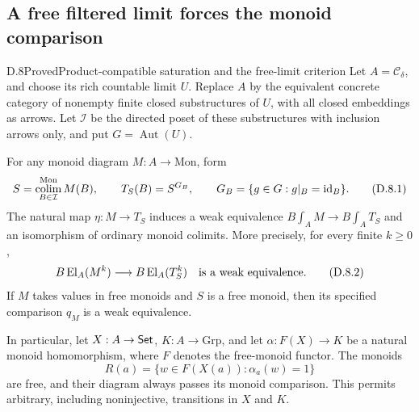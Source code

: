 \subsection{A free filtered limit forces the monoid comparison}

\begin{claim}{D.8}{Proved}{Product-compatible saturation and the free-limit criterion}
\label{D:free-limit-criterion}
Let $A=\mathcal C_\delta$, and choose its rich countable limit $U$.
Replace $A$ by the equivalent concrete category of nonempty finite
closed substructures of $U$, with all closed embeddings as arrows.
Let $\mathcal I$ be the directed poset of these substructures with
inclusion arrows only, and put $G=\operatorname{Aut}(U)$.

For any monoid diagram $M:A\to\mathrm{Mon}$, form
\[
 S=\operatorname*{colim}_{B\in\mathcal I}^{\mathrm{Mon}}M(B),
 \qquad T_S(B)=S^{G_B},
 \qquad G_B=\{g\in G:g|_B=\mathrm{id}_B\}.
 \tag{D.8.1}
\]
The natural map $\eta:M\to T_S$ induces a weak equivalence
$B\int_A M\to B\int_A T_S$ and an isomorphism of ordinary monoid
colimits. More precisely, for every finite $k\geq0$,
\[
 B\operatorname{El}_A(M^k)\longrightarrow B\operatorname{El}_A(T_S^k)
 \quad\text{is a weak equivalence}.
 \tag{D.8.2}
\]
If $M$ takes values in free monoids and $S$ is a free monoid, then
its specified comparison $q_M$ is a weak equivalence.

In particular, let $X:A\to\mathsf{Set}$, $K:A\to\mathrm{Grp}$, and let
$\alpha:F(X)\to K$ be a natural monoid homomorphism, where $F$
denotes the free-monoid functor. The monoids
\[
 R(a)=\{w\in F(X(a)):\alpha_a(w)=1\}
 \tag{D.8.3}
\]
are free, and their diagram always passes its monoid comparison.
This permits arbitrary, including noninjective, transitions in $X$
and $K$.
\end{claim}
